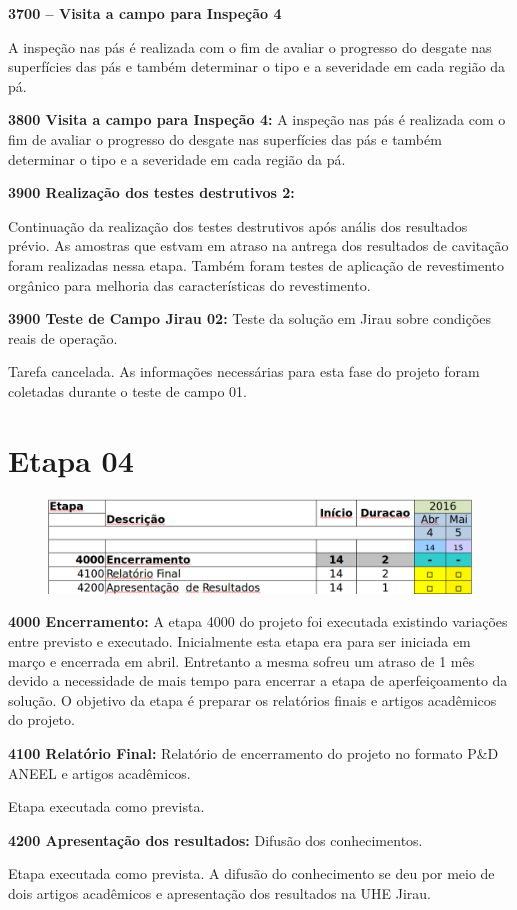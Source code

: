 


\noindent
\textbf{3700 – Visita a campo para Inspeção 4}

A inspeção nas pás é realizada com o fim de avaliar o progresso do desgate nas superfícies das
pás e também determinar o tipo e a severidade em cada região da pá.

\noindent
\textbf{3800  Visita a campo para Inspeção 4:}
A inspeção nas pás é realizada com o fim de avaliar o progresso do desgate nas superfícies das pás e também determinar o tipo e a severidade em cada região da pá. 

\noindent
\textbf{3900 Realização dos testes destrutivos 2:}

Continuação da realização dos testes destrutivos após anális dos resultados prévio. As amostras que estvam em atraso na antrega dos resultados de cavitação foram realizadas nessa etapa. Também foram testes de aplicação de revestimento orgânico para melhoria das características do revestimento.


\noindent
\textbf{3900 Teste de Campo Jirau 02:} Teste da solução  em Jirau sobre
condições reais de operação.

Tarefa cancelada. As informações necessárias para esta fase do
projeto foram coletadas durante o teste de campo 01. 

\section{Etapa 04} 

\begin{figure}[H]
\centering
\includegraphics[width=0.9\columnwidth]{figs/etapa4}
\end{figure} 

\noindent
\textbf{4000 Encerramento:} A etapa 4000 do projeto foi executada existindo
variações entre previsto e executado. Inicialmente esta etapa era para ser
iniciada em março e encerrada em abril. Entretanto a mesma sofreu um atraso de 1
mês devido a necessidade de mais tempo para encerrar a etapa de aperfeiçoamento
da solução. O objetivo da etapa é preparar os relatórios finais e artigos acadêmicos do projeto.

\noindent
\textbf{4100 Relatório Final:} Relatório de encerramento do projeto no formato
P\&D ANEEL e artigos acadêmicos.

Etapa executada como prevista. 

\noindent
\textbf{4200 Apresentação dos resultados:} Difusão dos conhecimentos.

Etapa executada como prevista. A difusão do conhecimento se deu por meio de dois
artigos acadêmicos e apresentação dos resultados na UHE Jirau.
